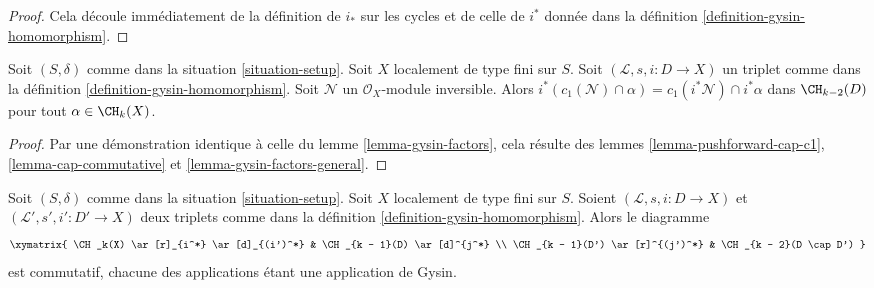 \begin{proof}
Cela découle immédiatement de la définition de $i_*$ sur les cycles
et de celle de $i^*$ donnée dans la
définition \ref{definition-gysin-homomorphism}.
\end{proof}

\begin{lemma}
\label{lemma-gysin-commutes-cap-c1}
Soit $(S, \delta)$ comme dans la situation \ref{situation-setup}. Soit $X$
localement de type fini sur $S$. Soit $(\mathcal{L}, s, i : D \to X)$
un triplet comme dans la définition \ref{definition-gysin-homomorphism}.
Soit $\mathcal{N}$ un $\mathcal{O}_X$-module inversible.
Alors $i^*(c_1(\mathcal{N}) \cap \alpha) = c_1(i^*\mathcal{N}) \cap i^*\alpha$
dans $\CH_{k - 2}(D)$ pour tout $\alpha \in \CH_k(X)$.
\end{lemma}

\begin{proof}
Par une démonstration identique à celle du lemme \ref{lemma-gysin-factors},
cela résulte des lemmes
\ref{lemma-pushforward-cap-c1},
\ref{lemma-cap-commutative} et
\ref{lemma-gysin-factors-general}.
\end{proof}

\begin{lemma}
\label{lemma-gysin-commutes-gysin}
Soit $(S, \delta)$ comme dans la situation \ref{situation-setup}. Soit $X$ localement
de type fini sur $S$. Soient $(\mathcal{L}, s, i : D \to X)$ et
$(\mathcal{L}', s', i' : D' \to X)$ deux triplets comme dans la
définition \ref{definition-gysin-homomorphism}. Alors le diagramme
$$
\xymatrix{
\CH_k(X) \ar[r]_{i^*} \ar[d]_{(i')^*} & \CH_{k - 1}(D) \ar[d]^{j^*} \\
\CH_{k - 1}(D') \ar[r]^{(j')^*} & \CH_{k - 2}(D \cap D')
}
$$
est commutatif, chacune des applications étant une application de Gysin.
\end{lemma}

